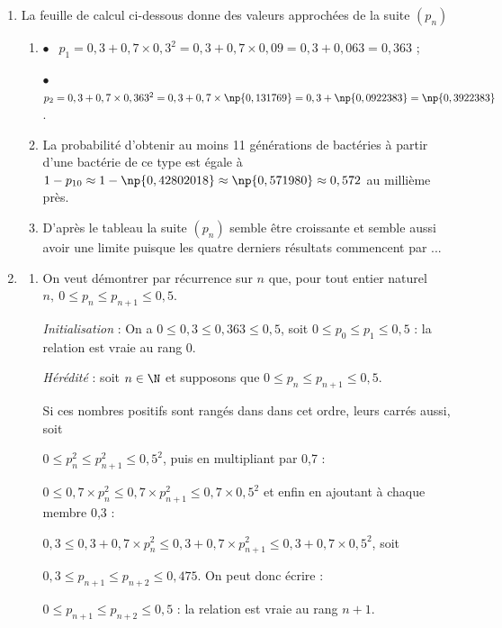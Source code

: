 \begin{enumerate}
\item La feuille de calcul ci-dessous donne des valeurs approchées de la suite $\left(p_n\right)$
	\begin{enumerate}
		\item 
$\bullet~~$ $p_1 = 0,3 + 0,7 \times 0,3^2 = 0,3 + 0,7 \times 0,09 = 0,3 + 0,063 = 0,363$ ;

$\bullet~~$ $p_2 = 0,3 + 0,7 \times 0,363^2 = 0,3 + 0,7 \times \np{0,131769} = 0,3 + \np{0,0922383} = \np{0,3922383}$.

		\item 
		La probabilité d'obtenir au moins 11 générations de bactéries à partir d'une bactérie de ce type est égale à $1 - p_{10} \approx 1 - \np{0,42802018} \approx \np{0,571980} \approx 0,572$ au millième près.
		
		\item 
D'après le tableau la suite $\left(p_n\right)$ semble être croissante et semble aussi avoir une limite puisque les quatre derniers résultats commencent par ...
	\end{enumerate}

\item 
	\begin{enumerate}
		\item On veut démontrer par récurrence sur $n$ que, pour tout entier naturel $n,\: 0 \leqslant p_n \leqslant p_{n+1} \leqslant0,5$.
		
\emph{Initialisation}  : On a $0 \leqslant 0,3 \leqslant 0,363 \leqslant 0,5$, soit $0 \leqslant p_0 \leqslant p_1 \leqslant 0,5$ : la relation est vraie au rang 0.

\emph{Hérédité} : soit $n \in \N$ et supposons que $0 \leqslant p_n \leqslant p_{n+1} \leqslant 0,5$.

Si ces nombres positifs sont rangés dans dans cet ordre, leurs carrés aussi, soit 

$0 \leqslant p_n^2 \leqslant p_{n+1}^2 \leqslant 0,5^2$, puis en multipliant par 0,7 :

$0 \leqslant 0,7 \times p_n^2 \leqslant 0,7 \times p_{n+1}^2 \leqslant 0,7 \times 0,5^2$ et enfin en ajoutant à chaque membre 0,3 :

$0,3 \leqslant 0,3 + 0,7 \times p_n^2 \leqslant 0,3 + 0,7 \times p_{n+1}^2 \leqslant 0,3 + 0,7 \times 0,5^2$, soit 

$0,3 \leqslant p_{n+1} \leqslant p_{n+2} \leqslant 0,475$. On peut donc écrire :

$0 \leqslant p_{n+1} \leqslant p_{n+2} \leqslant 0,5$ : la relation est vraie au rang $n + 1$.


\end{enumerate}
\end{enumerate}
